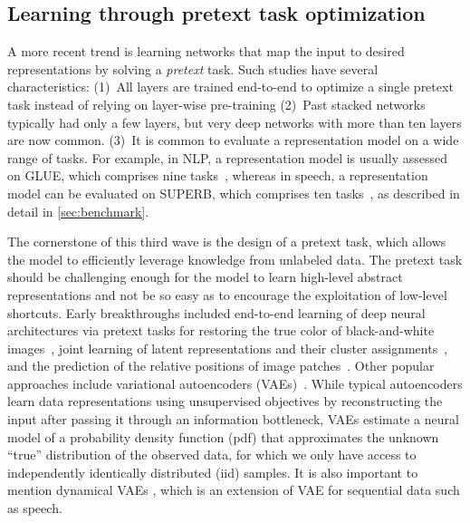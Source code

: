 \subsection{Learning through pretext task optimization}

A more recent trend is learning networks that map the input to desired
representations by solving a \textit{pretext} task. Such studies have several
characteristics:
(1)~All layers are trained end-to-end to optimize a single pretext task instead
of relying on layer-wise pre-training
(2)~Past stacked networks typically had only a few layers, but 
very deep networks with more than ten layers are now common.
(3)~It is common to evaluate a representation model on a wide range of tasks.
For example, in NLP, a representation model is usually assessed on GLUE,
which comprises nine tasks~\cite{wang_glue_2018}, whereas in speech, a representation model can be
evaluated on SUPERB, which comprises ten tasks~\cite{yang_superb_2021}, 
as described in detail in \cref{sec:benchmark}.

The cornerstone of this third wave is the design of a pretext task, which
allows the model to efficiently leverage knowledge from unlabeled data.
The pretext task should be challenging enough for the model to learn high-level
abstract representations and 
  not be so easy as to encourage the exploitation of low-level shortcuts.  %
Early breakthroughs included end-to-end learning of deep neural architectures
via pretext tasks for restoring the true color of black-and-white
images~\cite{zhang_colorful_2016}, joint learning of latent representations and their
cluster assignments~\cite{caron_deep_2018}, and the prediction of the relative positions of
image patches~\cite{doersch_unsupervised_2016}. Other popular approaches include variational
autoencoders (VAEs)~\cite{kingma_autoencoding_2014, rezende_stochastic_2014}. While typical autoencoders learn data
representations using unsupervised objectives by reconstructing the input
after passing it through an information bottleneck, VAEs estimate a neural model of a probability density function (pdf) that approximates the unknown “true” distribution of the observed data, for which we only have access to independently identically distributed (iid) samples. It is also important to mention dynamical VAEs \cite{girin_dynamical_2021}, which is an extension of VAE for sequential data such as speech.

